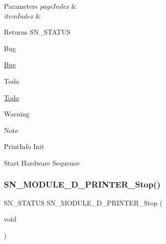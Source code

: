\begin{DoxyParams}{Parameters}
{\em page\+Index} & \\
\hline
{\em item\+Index} & \\
\hline
\end{DoxyParams}
\begin{DoxyReturn}{Returns}
S\+N\+\_\+\+S\+T\+A\+T\+US 
\end{DoxyReturn}
\begin{DoxyRefDesc}{Bug}
\item[\hyperlink{bug__bug000004}{Bug}]\end{DoxyRefDesc}
\begin{DoxyRefDesc}{Todo}
\item[\hyperlink{todo__todo000004}{Todo}]\end{DoxyRefDesc}
\begin{DoxyWarning}{Warning}

\end{DoxyWarning}
\begin{DoxyNote}{Note}

\end{DoxyNote}
Print\+Info Init

Start Hardware Sequence \mbox{\label{group__Module_ga21ca69a451fafe2c9218c9a1737e1f15}} 
\subsubsection{\texorpdfstring{S\+N\+\_\+\+M\+O\+D\+U\+L\+E\+\_\+D\+\_\+\+P\+R\+I\+N\+T\+E\+R\+\_\+\+Stop()}{SN\_MODULE\_3D\_PRINTER\_Stop()}}
{\footnotesize\ttfamily S\+N\+\_\+\+S\+T\+A\+T\+US S\+N\+\_\+\+M\+O\+D\+U\+L\+E\+\_\+D\+\_\+\+P\+R\+I\+N\+T\+E\+R\+\_\+\+Stop (\begin{DoxyParamCaption}\item[{void}]{ }\end{DoxyParamCaption})}


